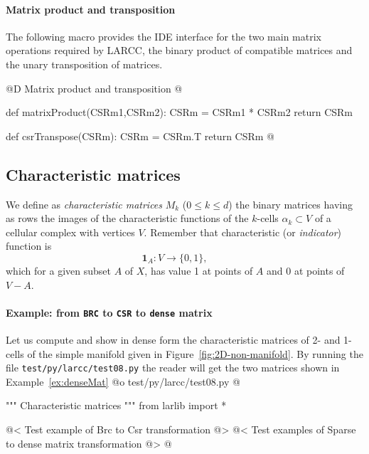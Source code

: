 \documentclass[11pt,oneside]{article}	%
\begin{document}
\paragraph{Matrix product and transposition}

The following macro provides the IDE interface for the two main matrix operations required by LARCC, the binary product of compatible matrices and the unary transposition of matrices.

@D Matrix product and transposition
@{def matrixProduct(CSRm1,CSRm2):
	CSRm = CSRm1 * CSRm2
	return CSRm

def csrTranspose(CSRm):
	CSRm = CSRm.T
	return CSRm
@}


\subsection{Characteristic matrices}

We define as \emph{characteristic matrices} $M_k$ ($0\leq k\leq d$) the binary matrices having as rows the images of the characteristic functions of the $k$-cells $\alpha_k\subset V$ of a cellular complex with vertices $V$.
Remember that characteristic (or \emph{indicator}) function is 
\[
\mathbf{1}_A\colon V \to \{0, 1\}, \qquad 
\]
which for a given subset $A$ of $X$, has value 1 at points of $A$ and 0 at points of $V - A$.
 
\paragraph{Example: from \texttt{BRC} to \texttt{CSR} to \texttt{dense} matrix} 
Let us compute and show in dense form the characteristic matrices of 2- and 1-cells of the simple manifold given in Figure~\ref{fig:2D-non-manifold}.
By running the file \texttt{test/py/larcc/test08.py} the reader will get the two matrices shown in Example~\ref{ex:denseMat}
@o test/py/larcc/test08.py
@{""" Characteristic matrices """
from larlib import *

@< Test example of Brc to Csr transformation @>
@< Test examples of Sparse to dense matrix transformation @>
@}
 
\end{document}
